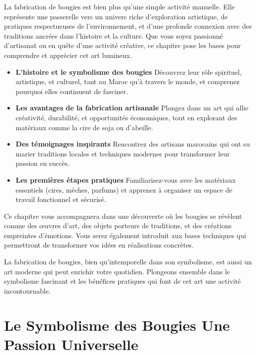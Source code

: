\documentclass[11pt,fleqn,onecolumn,oneside]{book}
\begin{document}
\begin{definition} La fabrication de bougies est bien plus qu’une simple activité manuelle. Elle représente une passerelle vers un univers riche d’exploration artistique, de pratiques respectueuses de l’environnement, et d’une profonde connexion avec des traditions ancrées dans l’histoire et la culture. Que vous soyez passionné d’artisanat ou en quête d’une activité créative, ce chapitre pose les bases pour comprendre et apprécier cet art lumineux. \end{definition}

\begin{itemize} \item \textbf{L’histoire et le symbolisme des bougies} Découvrez leur rôle spirituel, artistique, et culturel, tant au Maroc qu’à travers le monde, et comprenez pourquoi elles continuent de fasciner. \item \textbf{Les avantages de la fabrication artisanale} Plongez dans un art qui allie créativité, durabilité, et opportunités économiques, tout en explorant des matériaux comme la cire de soja ou d’abeille. \item \textbf{Des témoignages inspirants} Rencontrez des artisans marocains qui ont su marier traditions locales et techniques modernes pour transformer leur passion en succès. \item \textbf{Les premières étapes pratiques} Familiarisez-vous avec les matériaux essentiels (cires, mèches, parfums) et apprenez à organiser un espace de travail fonctionnel et sécurisé. \end{itemize}

\noindent Ce chapitre vous accompagnera dans une découverte où les bougies se révèlent comme des œuvres d’art, des objets porteurs de traditions, et des créations empreintes d’émotions. Vous serez également introduit aux bases techniques qui permettront de transformer vos idées en réalisations concrètes.

\begin{remark} La fabrication de bougies, bien qu’intemporelle dans son symbolisme, est aussi un art moderne qui peut enrichir votre quotidien. Plongeons ensemble dans le symbolisme fascinant et les bénéfices pratiques qui font de cet art une activité incontournable. \end{remark}

\section{Le Symbolisme des Bougies Une Passion Universelle}
\end{document}
